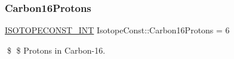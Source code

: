 \subsubsection{\texorpdfstring{Carbon16\+Protons}{Carbon16Protons}}
{\footnotesize\ttfamily \mbox{\hyperlink{group___isotope_const-_macros_ga5f18360b3e99483a35c32d789e62621c}{I\+S\+O\+T\+O\+P\+E\+C\+O\+N\+S\+T\+\_\+\+I\+NT}} Isotope\+Const\+::\+Carbon16\+Protons = 6}

\$ \$ Protons in Carbon-\/16. 